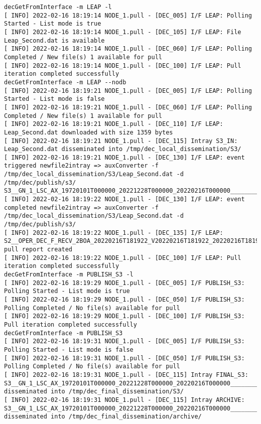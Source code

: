 \documentclass[dec_sum_main.tex]{subfiles}
\begin{document}
\begin{Verbatim}[fontsize=\tiny]
decGetFromInterface -m LEAP -l
[ INFO] 2022-02-16 18:19:14 NODE_1.pull - [DEC_005] I/F LEAP: Polling Started - List mode is true
[ INFO] 2022-02-16 18:19:14 NODE_1.pull - [DEC_105] I/F LEAP: File Leap_Second.dat is available
[ INFO] 2022-02-16 18:19:14 NODE_1.pull - [DEC_060] I/F LEAP: Polling Completed / New file(s) 1 available for pull
[ INFO] 2022-02-16 18:19:14 NODE_1.pull - [DEC_100] I/F LEAP: Pull iteration completed successfully
decGetFromInterface -m LEAP --nodb
[ INFO] 2022-02-16 18:19:21 NODE_1.pull - [DEC_005] I/F LEAP: Polling Started - List mode is false
[ INFO] 2022-02-16 18:19:21 NODE_1.pull - [DEC_060] I/F LEAP: Polling Completed / New file(s) 1 available for pull
[ INFO] 2022-02-16 18:19:21 NODE_1.pull - [DEC_110] I/F LEAP: Leap_Second.dat downloaded with size 1359 bytes
[ INFO] 2022-02-16 18:19:21 NODE_1.pull - [DEC_115] Intray S3_IN: Leap_Second.dat disseminated into /tmp/dec_local_dissemination/S3/
[ INFO] 2022-02-16 18:19:21 NODE_1.pull - [DEC_130] I/F LEAP: event triggered newfile2intray => auxConverter -f /tmp/dec_local_dissemination/S3/Leap_Second.dat -d /tmp/dec/publish/s3/
S3__GN_1_LSC_AX_19720101T000000_20221228T000000_20220216T000000_____________________USN_O_NR_POD.SEN3
[ INFO] 2022-02-16 18:19:22 NODE_1.pull - [DEC_130] I/F LEAP: event completed newfile2intray => auxConverter -f /tmp/dec_local_dissemination/S3/Leap_Second.dat -d /tmp/dec/publish/s3/
[ INFO] 2022-02-16 18:19:22 NODE_1.pull - [DEC_135] I/F LEAP: S2__OPER_DEC_F_RECV_2BOA_20220216T181922_V20220216T181922_20220216T181922_LEAP.xml pull report created
[ INFO] 2022-02-16 18:19:22 NODE_1.pull - [DEC_100] I/F LEAP: Pull iteration completed successfully
decGetFromInterface -m PUBLISH_S3 -l
[ INFO] 2022-02-16 18:19:29 NODE_1.pull - [DEC_005] I/F PUBLISH_S3: Polling Started - List mode is true
[ INFO] 2022-02-16 18:19:29 NODE_1.pull - [DEC_050] I/F PUBLISH_S3: Polling Completed / No file(s) available for pull
[ INFO] 2022-02-16 18:19:29 NODE_1.pull - [DEC_100] I/F PUBLISH_S3: Pull iteration completed successfully
decGetFromInterface -m PUBLISH_S3
[ INFO] 2022-02-16 18:19:31 NODE_1.pull - [DEC_005] I/F PUBLISH_S3: Polling Started - List mode is false
[ INFO] 2022-02-16 18:19:31 NODE_1.pull - [DEC_050] I/F PUBLISH_S3: Polling Completed / No file(s) available for pull
[ INFO] 2022-02-16 18:19:31 NODE_1.pull - [DEC_115] Intray FINAL_S3: S3__GN_1_LSC_AX_19720101T000000_20221228T000000_20220216T000000_____________________USN_O_NR_POD.SEN3 disseminated into /tmp/dec_final_dissemination/S3/
[ INFO] 2022-02-16 18:19:31 NODE_1.pull - [DEC_115] Intray ARCHIVE: S3__GN_1_LSC_AX_19720101T000000_20221228T000000_20220216T000000_____________________USN_O_NR_POD.SEN3 disseminated into /tmp/dec_final_dissemination/archive/

\end{Verbatim}
\end{document}
